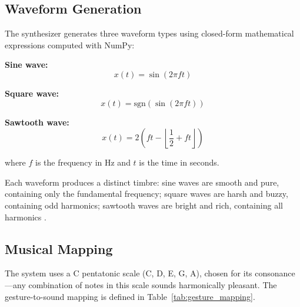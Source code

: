\documentclass[conference]{IEEEtran}
\begin{document}
\subsection{Waveform Generation}

The synthesizer generates three waveform types using closed-form mathematical expressions computed with NumPy:

\textbf{Sine wave:}
\begin{equation}
x(t) = \sin(2\pi f t)
\label{eq:sine}
\end{equation}

\textbf{Square wave:}
\begin{equation}
x(t) = \text{sgn}(\sin(2\pi f t))
\label{eq:square}
\end{equation}

\textbf{Sawtooth wave:}
\begin{equation}
x(t) = 2\left(ft - \left\lfloor \frac{1}{2} + ft \right\rfloor\right)
\label{eq:sawtooth}
\end{equation}

where $f$ is the frequency in Hz and $t$ is the time in seconds.

Each waveform produces a distinct timbre: sine waves are smooth and pure, containing only the fundamental frequency; square waves are harsh and buzzy, containing odd harmonics; sawtooth waves are bright and rich, containing all harmonics \cite{smith2007mathematics}.

\subsection{Musical Mapping}

The system uses a C pentatonic scale (C, D, E, G, A), chosen for its consonance---any combination of notes in this scale sounds harmonically pleasant. The gesture-to-sound mapping is defined in Table~\ref{tab:gesture_mapping}.
\end{document}
